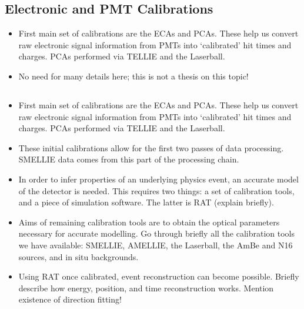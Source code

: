 {    \subsection{Electronic and PMT Calibrations}
    \begin{itemize}
        \item First main set of calibrations are the ECAs and PCAs. These help us convert raw electronic signal information from PMTs into `calibrated' hit times and charges. PCAs performed via TELLIE and the Laserball.
        \item No need for many details here; this is not a thesis on this topic!
    \end{itemize}
    \subsection{}
    \begin{itemize}
        \item First main set of calibrations are the ECAs and PCAs. These help us convert raw electronic signal information from PMTs into `calibrated' hit times and charges. PCAs performed via TELLIE and the Laserball.
        \item These initial calibrations allow for the first two passes of data processing. SMELLIE data comes from this part of the processing chain.
        \item In order to infer properties of an underlying physics event, an accurate model of the detector is needed. This requires two things: a set of calibration tools, and a piece of simulation software. The latter is RAT (explain briefly).
        \item Aims of remaining calibration tools are to obtain the optical parameters necessary for accurate modelling. Go through briefly all the calibration tools we have available: SMELLIE, AMELLIE, the Laserball, the AmBe and N16 sources, and in situ backgrounds.
        \item Using RAT once calibrated, event reconstruction can become possible. Briefly describe how energy, position, and time reconstruction works. Mention existence of direction fitting!
    \end{itemize}
}
